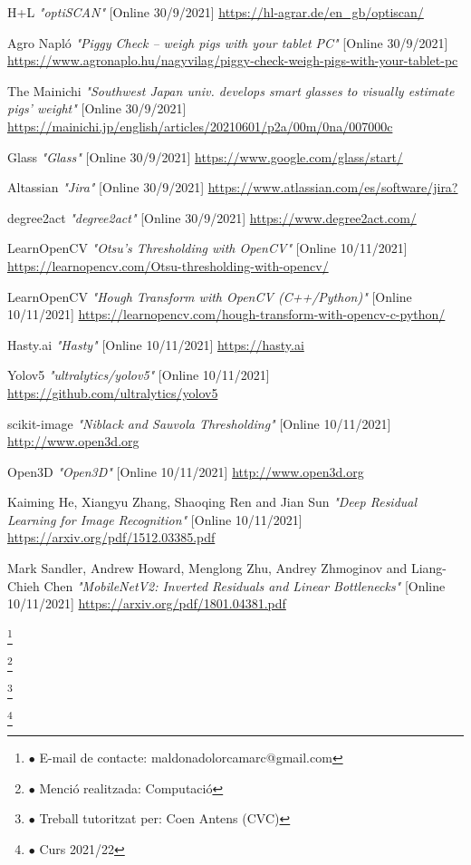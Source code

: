 \documentclass[12pt,a4paper]{article}
\newcommand\blfootnote[1]{%
  \begingroup
  \renewcommand\thefootnote{}\footnote{#1}%
  \addtocounter{footnote}{-1}%
  \endgroup
}
\begin{document}
\begin{thebibliography}{5}
    H+L \emph{"optiSCAN"} [Online 30/9/2021]
    \url{https://hl-agrar.de/en_gb/optiscan/}

    Agro Napló \emph{"Piggy Check – weigh pigs with your tablet PC"} [Online 30/9/2021]
    \url{https://www.agronaplo.hu/nagyvilag/piggy-check-weigh-pigs-with-your-tablet-pc}

    The Mainichi \emph{"Southwest Japan univ. develops smart glasses to visually estimate pigs' weight"} [Online 30/9/2021]
    \url{https://mainichi.jp/english/articles/20210601/p2a/00m/0na/007000c}

    Glass \emph{"Glass"} [Online 30/9/2021]
    \url{https://www.google.com/glass/start/}

    Altassian \emph{"Jira"} [Online 30/9/2021]
    \url{https://www.atlassian.com/es/software/jira?}

    degree2act \emph{"degree2act"} [Online 30/9/2021]
    \url{https://www.degree2act.com/}
    
    LearnOpenCV \emph{"Otsu’s Thresholding with OpenCV"} [Online 10/11/2021]
    \url{https://learnopencv.com/Otsu-thresholding-with-opencv/}

    LearnOpenCV \emph{"Hough Transform with OpenCV (C++/Python)"} [Online 10/11/2021]
    \url{https://learnopencv.com/hough-transform-with-opencv-c-python/}

    Hasty.ai \emph{"Hasty"} [Online 10/11/2021]
    \url{https://hasty.ai}

    Yolov5 \emph{"ultralytics/yolov5"} [Online 10/11/2021]
    \url{https://github.com/ultralytics/yolov5}

    scikit-image \emph{"Niblack and Sauvola Thresholding"} [Online 10/11/2021]
    \url{http://www.open3d.org}

    Open3D \emph{"Open3D"} [Online 10/11/2021]
    \url{http://www.open3d.org}

    Kaiming He, Xiangyu Zhang, Shaoqing Ren and Jian Sun \emph{"Deep Residual Learning for Image Recognition"} [Online 10/11/2021]
    \url{https://arxiv.org/pdf/1512.03385.pdf}

    Mark Sandler, Andrew Howard, Menglong Zhu, Andrey Zhmoginov and Liang-Chieh Chen \emph{"MobileNetV2: Inverted Residuals and Linear Bottlenecks"} [Online 10/11/2021]
    \url{https://arxiv.org/pdf/1801.04381.pdf}


\end{thebibliography}




\setcounter{section}{1}

\blfootnote{$\bullet$ E-mail de contacte: maldonadolorcamarc@gmail.com}
\blfootnote{$\bullet$ Menció realitzada: Computació}
\blfootnote{$\bullet$ Treball tutoritzat per: Coen Antens (CVC)}
\blfootnote{$\bullet$ Curs 2021/22}
\end{document}
